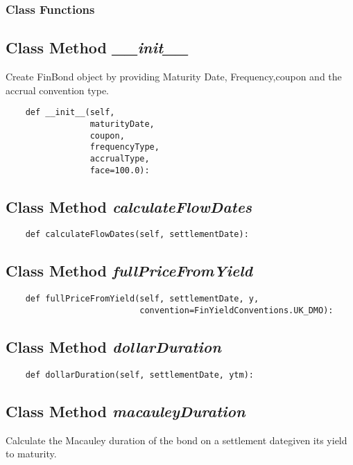 \documentclass[twoside,11pt]{book}
\begin{document}
\subsubsection{Class Functions}

\subsection{Class Method {\it \_\_init\_\_}}
Create FinBond object by providing Maturity Date, Frequency,coupon and the accrual convention type. 

\begin{lstlisting}
    def __init__(self,
                 maturityDate,
                 coupon,
                 frequencyType,
                 accrualType,
                 face=100.0):
\end{lstlisting}

\subsection{Class Method {\it calculateFlowDates}}


\begin{lstlisting}
    def calculateFlowDates(self, settlementDate):
\end{lstlisting}

\subsection{Class Method {\it fullPriceFromYield}}


\begin{lstlisting}
    def fullPriceFromYield(self, settlementDate, y,
                           convention=FinYieldConventions.UK_DMO):
\end{lstlisting}

\subsection{Class Method {\it dollarDuration}}


\begin{lstlisting}
    def dollarDuration(self, settlementDate, ytm):
\end{lstlisting}

\subsection{Class Method {\it macauleyDuration}}
Calculate the Macauley duration of the bond on a settlement dategiven its yield to maturity. 
\end{document}
